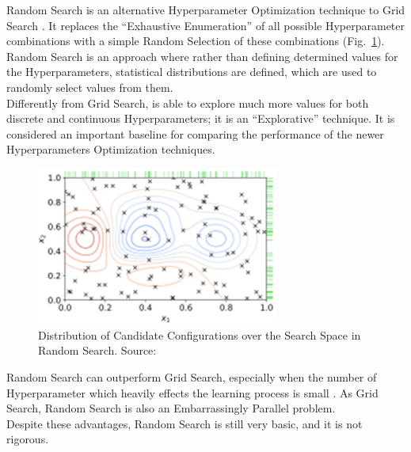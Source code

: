 Random Search is an alternative Hyperparameter Optimization technique to Grid Search \cite{OptunaSamplers-RandomSearch}.
It replaces the “Exhaustive Enumeration” of all possible Hyperparameter combinations with a simple Random Selection of these combinations (Fig.~\ref{fig:figure-2.2.4}).
\\[0.3cm]Random Search is an approach where rather than defining determined values for the Hyperparameters, statistical distributions are defined, which are used to randomly select values from them.
\\[0.3cm]Differently from Grid Search, is able to explore much more values for both discrete and continuous Hyperparameters; it is an “Explorative” technique.
It is considered an important baseline for comparing the performance of the newer Hyperparameters Optimization techniques.
\begin{figure}[t]
	\centering
	\includegraphics[width=8cm]{figures/figure-2.2.4.png}
	\caption[Candidates Distribution in Random Search]{Distribution of Candidate Configurations over the Search Space in Random Search. Source:~\cite{Tesi-1.1}}
	\label{fig:figure-2.2.4}
\end{figure}	

Random Search can outperform Grid Search, especially when the number of Hyperparameter which heavily effects the learning process is small \cite{OptunaSamplers-RandomSearch}.
As Grid Search, Random Search is also an Embarrassingly Parallel problem.
\\[0.3cm]Despite these advantages, Random Search is still very basic, and it is not rigorous.


